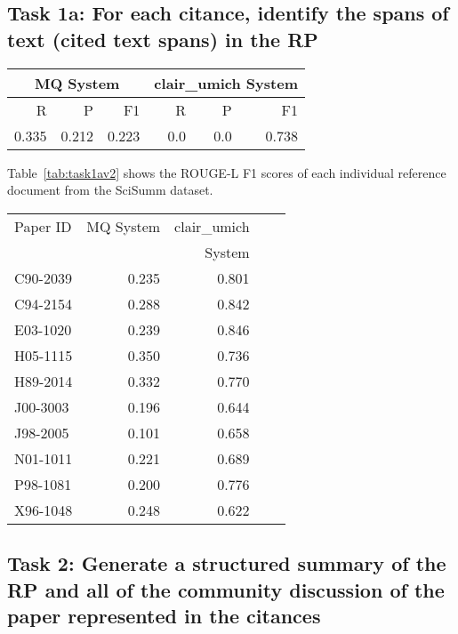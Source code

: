 \documentclass[11pt]{article}
\begin{document}
\subsection{Task 1a: For each citance, identify the spans of text 
			(cited text spans) in the RP}

\begin{table*}
\centering
	\begin{tabular}{|r|r|r|r|r|r|}
	\hline
	\multicolumn{3}{|c|}{MQ System} & \multicolumn{3}{|c|}{clair\_umich System}\\
	\hline
	R & P & F1 & R & P & F1\\
	\hline
	0.335 & 0.212 & 0.223 & 0.0 & 0.0 & 0.738\\
	\hline
	\end{tabular}
\caption{Task 1a performance for the participating systems expressed as ROUGE-L score
 averaged over all topics}
\label{tab:task1a}
\end{table*}

Table~\ref{tab:task1av2} shows the ROUGE-L F1 scores of each individual reference document from the SciSumm dataset.

\begin{table*}
  \centering
  \begin{tabular}{|l|r|r|r|r|}
  	\hline
	Paper ID & MQ System & clair\_umich \\
	&	&	System\\
	\hline
	C90-2039 & 0.235 & 0.801\\ 
	C94-2154 & 0.288 & 0.842\\
	E03-1020 & 0.239 & 0.846\\
	H05-1115 & 0.350 & 0.736\\
	H89-2014 & 0.332 & 0.770\\
	J00-3003 & 0.196 & 0.644\\
	J98-2005 & 0.101 & 0.658\\
	N01-1011 & 0.221 & 0.689\\
	P98-1081 & 0.200 & 0.776\\
	X96-1048 & 0.248 & 0.622\\
	\hline
  \end{tabular}
\caption{Task 1a ROUGE-L F1 scores for individual topics}
\label{tab:task1av2}
\end{table*}

\subsection{Task 2: Generate a structured summary of the RP and all of the 
			community discussion of the paper represented in the citances}
\end{document}
